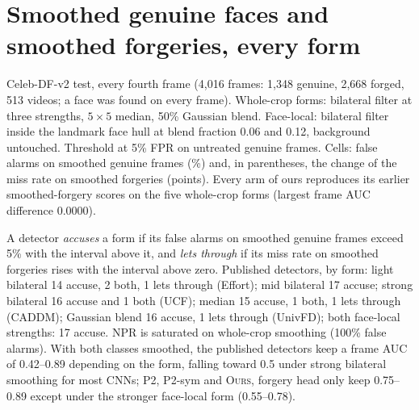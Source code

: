 \documentclass[10pt]{article}
\newcommand{\oursB}{\textsc{Ours}, forgery head only}
\begin{document}
\section{Smoothed genuine faces and smoothed forgeries, every form}
\label{sec:smooth38}
\begin{table}[H]
\centering
\caption{Celeb-DF-v2 test, every fourth frame (4,016 frames: 1,348 genuine, 2,668 forged, 513 videos; a face was found on every
frame). Whole-crop forms: bilateral filter at three strengths, $5\times5$ median, 50\% Gaussian blend. Face-local: bilateral
filter inside the landmark face hull at blend fraction 0.06 and 0.12, background untouched. Threshold at 5\% FPR on untreated
genuine frames. Cells: false alarms on smoothed genuine frames (\%) and, in parentheses, the change of the miss rate on smoothed
forgeries (points). Every arm of ours reproduces its earlier smoothed-forgery scores on the five whole-crop forms (largest frame
AUC difference 0.0000).}
\label{tab:smooth38}
\scriptsize
\begin{adjustbox}{max width=\linewidth}\end{adjustbox}
\end{table}
A detector \emph{accuses} a form if its false alarms on smoothed genuine frames exceed 5\% with the interval above it, and \emph{lets
through} if its miss rate on smoothed forgeries rises with the interval above zero. Published detectors, by form: light bilateral
14 accuse, 2 both, 1 lets through (Effort); mid bilateral 17 accuse; strong bilateral 16 accuse and 1 both (UCF); median 15 accuse,
1 both, 1 lets through (CADDM); Gaussian blend 16 accuse, 1 lets through (UnivFD); both face-local strengths: 17 accuse. NPR is
saturated on whole-crop smoothing (100\% false alarms). With both classes smoothed, the published detectors keep a frame AUC of
0.42--0.89 depending on the form, falling toward 0.5 under strong bilateral smoothing for most CNNs; P2, P2-sym and \oursB{} keep
0.75--0.89 except under the stronger face-local form (0.55--0.78).
\end{document}
